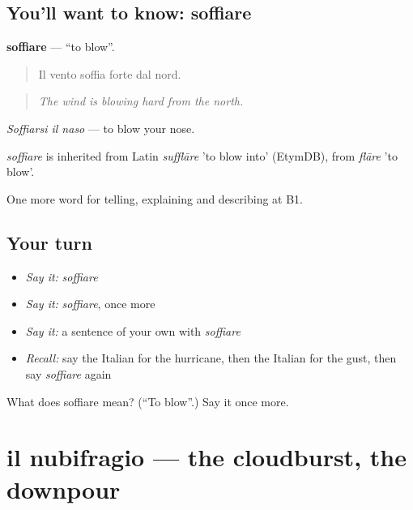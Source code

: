 \subsection*{You'll want to know: soffiare}
\textbf{soffiare} — \textquotedblleft{}to blow\textquotedblright{}.

\begin{quote}
Il vento soffia forte dal nord.
\end{quote}

\begin{quote}
\emph{The wind is blowing hard from the north.}
\end{quote}

\emph{Soffiarsi il naso} — to blow your nose.

\begin{cousinweb}
\emph{soffiare} is inherited from Latin \emph{sufflāre} 'to blow into' (EtymDB), from \emph{flāre} 'to blow'.
\end{cousinweb}

\begin{grammarlens}[title={What you've built}]
One more word for telling, explaining and describing at B1.
\end{grammarlens}

\subsection*{Your turn}
\begin{itemize}
\raggedright
  \item \emph{Say it:} \emph{soffiare}
  \item \emph{Say it:} \emph{soffiare}, once more
  \item \emph{Say it:} a sentence of your own with \emph{soffiare}
  \item \emph{Recall:} say the Italian for the hurricane, then the Italian for the gust, then say \emph{soffiare} again
\end{itemize}

\begin{tcolorbox}[breakable,colback=teal!4,colframe=teal!35!black,title={Before you move on}]
What does soffiare mean? (\textquotedblleft{}To blow\textquotedblright{}.) Say it once more.
\end{tcolorbox}
\section[il nubifragio]{il nubifragio — the cloudburst, the downpour}

